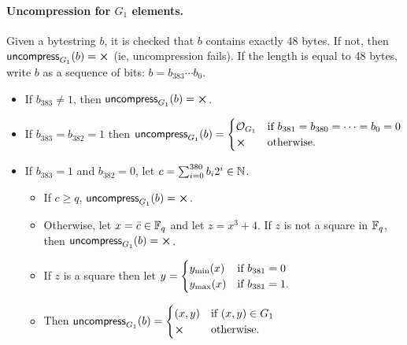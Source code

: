 \paragraph{Uncompression for $G_1$ elements.}  Given a bytestring $b$, it is checked that
$b$ contains exactly 48 bytes.  If not, then $\uncompress_{G_1}(b) = \errorX$ (ie,
uncompression fails).  If the length is equal to 48 bytes, write $b$ as a
sequence of bits: $b = b_{383} \cdots b_0$.
\begin{itemize}
\item If $b_{383} \neq 1$, then $\uncompress_{G_1}(b) = \errorX$.
\item If $b_{383} = b_{382} = 1$ then
$\uncompress_{G_1}(b) =
\begin{cases}
\mathcal{O}_{G_1} & \text{if $b_{381} = b_{380} = \cdots = b_0 = 0$}\\
\errorX & \text{otherwise}.
\end{cases}$
\item If $b_{383}=1$ and $b_{382}=0$, let $c=\sum_{i=0}^{380}b_i2^i \in \mathbb{N}$.
\begin{itemize}
\item If $c \geq q$, $\uncompress_{G_1}(b) = \errorX$.
\item Otherwise, let $x = \bar{c} \in \mathbb{F}_q$ and let $z = x^3+4$. If $z$ is not a
square in $\mathbb{F}_q$, then $\uncompress_{G_1}(b) = \errorX$.
\item If $z$ is a square then let
$y=\begin{cases}
y_{\text{min}}(x) & \text{if $b_{381}=0$}\\
y_{\text{max}}(x) & \text{if $b_{381}=1$}.
\end{cases}$
\item Then $\uncompress_{G_1}(b) = \begin{cases}
(x,y) & \text{if $(x,y) \in G_1$}\\
\errorX & \text{otherwise}.
\end{cases}$
\end{itemize}
\end{itemize}


